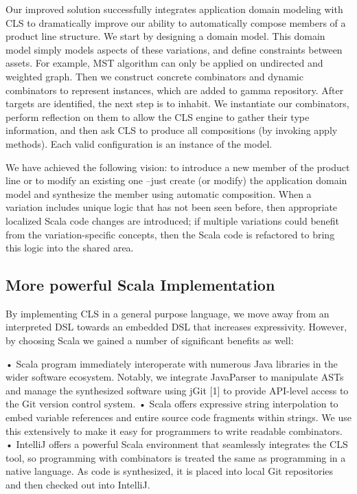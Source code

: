 
Our improved solution successfully integrates application domain modeling with CLS to dramatically improve our
ability to automatically compose members of a product line structure. We start by designing a domain model.
This domain model simply models aspects of these variations, and define constraints between assets. For example,
MST algorithm can only be applied on undirected and weighted graph. Then we construct concrete combinators and dynamic
combinators to represent instances, which are added to gamma repository. After targets are identified, the next step
is to inhabit. We instantiate our combinators, perform reflection on them to allow the CLS engine to gather their type
information, and then ask CLS to produce all compositions (by invoking apply methods). Each valid configuration is
an instance of the model.

We have achieved the following vision: to introduce a new member of the product line or to modify an
existing one –just create (or modify) the application domain model and synthesize the member using
automatic composition. When a variation includes unique logic that has not been seen before, then appropriate
 localized Scala code changes are introduced; if multiple variations could benefit from the variation-specific concepts,
  then the Scala code is refactored to bring this logic into the shared area.

 \subsection{More powerful Scala Implementation}

 By implementing CLS in a general purpose language, we move away from an interpreted DSL towards an embedded DSL
 that increases expressivity. However, by choosing Scala we gained a number of significant benefits as well:

 • Scala program immediately interoperate with numerous Java libraries in the wider software ecosystem. Notably,
 we integrate JavaParser to manipulate ASTs and manage the synthesized software using jGit [1] to
 provide API-level access to the Git version control system.
 • Scala offers expressive string interpolation to embed variable references and entire source code fragments within strings.
 We use this extensively to make it easy for programmers to write readable combinators.
 • IntelliJ offers a powerful Scala environment that seamlessly integrates the CLS tool, so programming with
 combinators is treated the same as programming in a native language. As code is synthesized, it is placed
 into local Git repositories and then checked out into IntelliJ.

